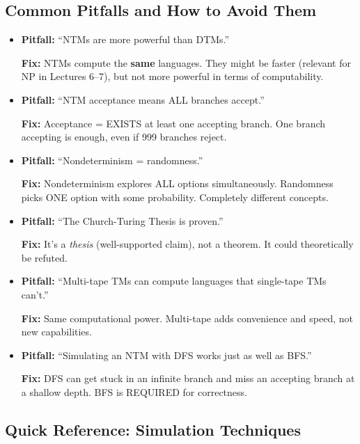 \documentclass[11pt,a4paper]{article}
\begin{document}
\subsection{Common Pitfalls and How to Avoid Them}

\begin{itemize}
\item \textbf{Pitfall:} ``NTMs are more powerful than DTMs.''

\textbf{Fix:} NTMs compute the \textbf{same} languages. They might be faster (relevant for NP in Lectures 6--7), but not more powerful in terms of computability.

\item \textbf{Pitfall:} ``NTM acceptance means ALL branches accept.''

\textbf{Fix:} Acceptance = EXISTS at least one accepting branch. One branch accepting is enough, even if 999 branches reject.

\item \textbf{Pitfall:} ``Nondeterminism = randomness.''

\textbf{Fix:} Nondeterminism explores ALL options simultaneously. Randomness picks ONE option with some probability. Completely different concepts.

\item \textbf{Pitfall:} ``The Church-Turing Thesis is proven.''

\textbf{Fix:} It's a \textit{thesis} (well-supported claim), not a theorem. It could theoretically be refuted.

\item \textbf{Pitfall:} ``Multi-tape TMs can compute languages that single-tape TMs can't.''

\textbf{Fix:} Same computational power. Multi-tape adds convenience and speed, not new capabilities.

\item \textbf{Pitfall:} ``Simulating an NTM with DFS works just as well as BFS.''

\textbf{Fix:} DFS can get stuck in an infinite branch and miss an accepting branch at a shallow depth. BFS is REQUIRED for correctness.
\end{itemize}

\subsection{Quick Reference: Simulation Techniques}
\end{document}
